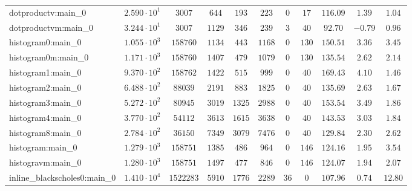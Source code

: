 \begin{tabular}{|l|c|c|c|c|c|c|c|c|c|c|}
dotproductv:main\_0            & $ 2.590 \cdot 10^{1} $ & $ 3007     $ & $ 644    $ & $ 193    $ & $ 223    $ & $ 0    $ & $ 17   $ & $ 116.09      $ & $ 1.39    $ & $ 1.04    $ \\
dotproductvm:main\_0           & $ 3.244 \cdot 10^{1} $ & $ 3007     $ & $ 1129   $ & $ 346    $ & $ 239    $ & $ 3    $ & $ 40   $ & $ 92.70       $ & $ -0.79   $ & $ 0.96    $ \\
histogram0:main\_0             & $ 1.055 \cdot 10^{3} $ & $ 158760   $ & $ 1134   $ & $ 443    $ & $ 1168   $ & $ 0    $ & $ 130  $ & $ 150.51      $ & $ 3.36    $ & $ 3.45    $ \\
histogram0m:main\_0            & $ 1.171 \cdot 10^{3} $ & $ 158760   $ & $ 1407   $ & $ 479    $ & $ 1079   $ & $ 0    $ & $ 130  $ & $ 135.54      $ & $ 2.62    $ & $ 2.14    $ \\
histogram1:main\_0             & $ 9.370 \cdot 10^{2} $ & $ 158762   $ & $ 1422   $ & $ 515    $ & $ 999    $ & $ 0    $ & $ 40   $ & $ 169.43      $ & $ 4.10    $ & $ 1.46    $ \\
histogram2:main\_0             & $ 6.488 \cdot 10^{2} $ & $ 88039    $ & $ 2191   $ & $ 883    $ & $ 1825   $ & $ 0    $ & $ 40   $ & $ 135.69      $ & $ 2.63    $ & $ 1.67    $ \\
histogram3:main\_0             & $ 5.272 \cdot 10^{2} $ & $ 80945    $ & $ 3019   $ & $ 1325   $ & $ 2988   $ & $ 0    $ & $ 40   $ & $ 153.54      $ & $ 3.49    $ & $ 1.86    $ \\
histogram4:main\_0             & $ 3.770 \cdot 10^{2} $ & $ 54112    $ & $ 3613   $ & $ 1615   $ & $ 3638   $ & $ 0    $ & $ 40   $ & $ 143.53      $ & $ 3.03    $ & $ 1.84    $ \\
histogram8:main\_0             & $ 2.784 \cdot 10^{2} $ & $ 36150    $ & $ 7349   $ & $ 3079   $ & $ 7476   $ & $ 0    $ & $ 40   $ & $ 129.84      $ & $ 2.30    $ & $ 2.62    $ \\
histogram:main\_0              & $ 1.279 \cdot 10^{3} $ & $ 158751   $ & $ 1385   $ & $ 486    $ & $ 964    $ & $ 0    $ & $ 146  $ & $ 124.16      $ & $ 1.95    $ & $ 3.54    $ \\
histogravm:main\_0             & $ 1.280 \cdot 10^{3} $ & $ 158751   $ & $ 1497   $ & $ 477    $ & $ 846    $ & $ 0    $ & $ 146  $ & $ 124.07      $ & $ 1.94    $ & $ 2.07    $ \\
inline\_blackscholes0:main\_0  & $ 1.410 \cdot 10^{4} $ & $ 1522283  $ & $ 5910   $ & $ 1776   $ & $ 2289   $ & $ 36   $ & $ 0    $ & $ 107.96      $ & $ 0.74    $ & $ 12.80   $ \\

\end{tabular}
